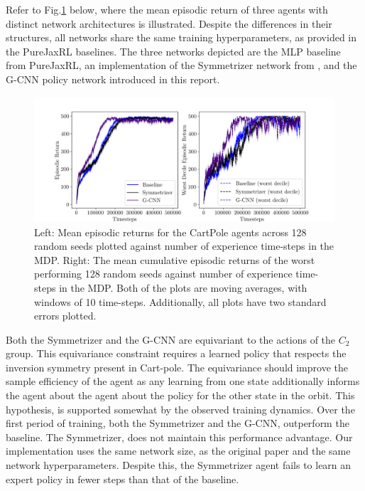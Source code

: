 Refer to Fig.\ref{fig:cartpole_equivariant_actor} below, where the mean episodic return of three agents with distinct network architectures is illustrated. Despite the differences in their structures, all networks share the same training hyperparameters, as provided in the PureJaxRL\cite{lu2022discovered} baselines. The three networks depicted are the MLP baseline from PureJaxRL, an implementation of the Symmetrizer network from \cite{vanderpol2020mdp}, and the G-CNN policy network introduced in this report.

\begin{figure}[H]
	\centering
	\includegraphics[width=\linewidth]{Figures/cart_pole_returns.png}
	\caption{Left: Mean episodic returns for the CartPole agents across 128 random seeds plotted against number of experience time-steps in the MDP. Right: The mean cumulative episodic returns of the worst performing 128 random seeds against number of experience time-steps in the MDP. Both of the plots are moving averages, with windows of 10 time-steps. Additionally, all plots have two standard errors plotted. } \label{fig:cartpole_equivariant_actor}
\end{figure}

Both the Symmetrizer and the G-CNN are equivariant to the actions of the $C_2$ group. This equivariance constraint requires a learned policy that respects the inversion symmetry present in Cart-pole. The equivariance  should improve the sample efficiency of the agent as any learning from one state additionally informs the agent about the agent about the policy for the other state in the orbit. This hypothesis, is supported somewhat by the observed training dynamics. Over the first period of training, both the Symmetrizer and the G-CNN, outperform the baseline. The Symmetrizer, does not maintain this performance advantage. Our implementation uses the same network size, as the original paper and the same network hyperparameters. Despite this, the Symmetrizer agent fails to learn an expert policy in fewer steps than that of the baseline.

